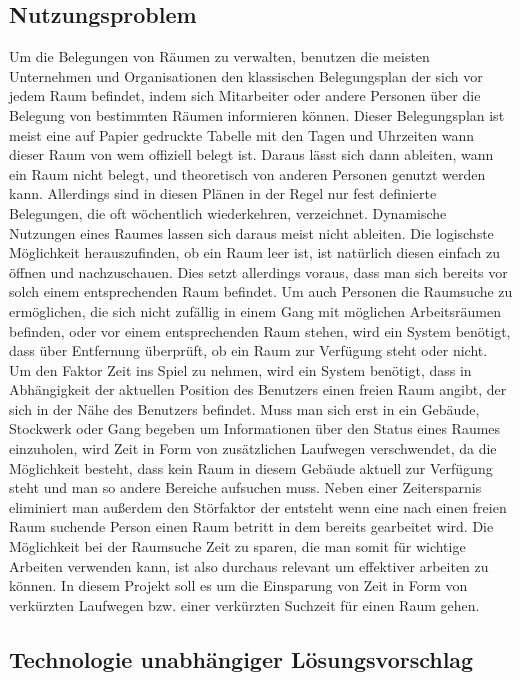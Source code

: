 \subsection{Nutzungsproblem}
\label{sec:Nutzungsproblem}

Um die Belegungen von Räumen zu verwalten, benutzen die meisten Unternehmen und
Organisationen den klassischen Belegungsplan der sich vor jedem Raum befindet,
indem sich Mitarbeiter oder andere Personen über die Belegung von bestimmten
Räumen informieren können. Dieser Belegungsplan ist meist eine auf Papier
gedruckte Tabelle mit den Tagen und Uhrzeiten wann dieser Raum von wem
offiziell belegt ist. Daraus lässt sich dann ableiten, wann ein Raum nicht
belegt, und theoretisch von anderen Personen genutzt werden kann. Allerdings
sind in diesen Plänen in der Regel nur fest definierte Belegungen, die oft
wöchentlich wiederkehren, verzeichnet. Dynamische Nutzungen eines Raumes lassen
sich daraus meist nicht ableiten. Die logischste Möglichkeit herauszufinden, ob
ein Raum leer ist, ist natürlich diesen einfach zu öffnen und nachzuschauen.
Dies setzt allerdings voraus, dass man sich bereits vor solch einem
entsprechenden Raum befindet. Um auch Personen die Raumsuche zu ermöglichen,
die sich nicht zufällig in einem Gang mit möglichen Arbeitsräumen befinden,
oder vor einem entsprechenden Raum stehen, wird ein System benötigt, dass über
Entfernung überprüft, ob ein Raum zur Verfügung steht oder nicht. Um den Faktor
Zeit ins Spiel zu nehmen, wird ein System benötigt, dass in Abhängigkeit der
aktuellen Position des Benutzers einen freien Raum angibt, der sich in der Nähe
des Benutzers befindet. Muss man sich erst in ein Gebäude, Stockwerk oder Gang
begeben um Informationen über den Status eines Raumes einzuholen, wird Zeit in
Form von zusätzlichen Laufwegen verschwendet, da die Möglichkeit besteht, dass
kein Raum in diesem Gebäude aktuell zur Verfügung steht und man so andere
Bereiche aufsuchen muss. Neben einer Zeitersparnis eliminiert man außerdem den
Störfaktor der entsteht wenn eine nach einen freien Raum suchende Person einen
Raum betritt in dem bereits gearbeitet wird. Die Möglichkeit bei der Raumsuche
Zeit zu sparen, die man somit für wichtige Arbeiten verwenden kann, ist also
durchaus relevant um effektiver arbeiten zu können.   
In diesem Projekt soll es um die Einsparung von Zeit in Form von verkürzten
Laufwegen bzw. einer verkürzten Suchzeit für einen Raum gehen.


\subsection{Technologie unabhängiger Lösungsvorschlag}
\label{sec:Technologie_unabhängiger_Lösungsvorschlag}

